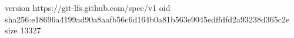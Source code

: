 version https://git-lfs.github.com/spec/v1
oid sha256:e18696a4199ad90a8aafb56c6d164b0a81b563e9045edffdfd2a93238d365c2e
size 13327
